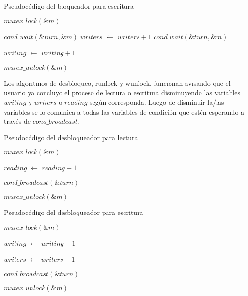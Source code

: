 \begin{algorithm}[H]
  \begin{algorithmic}[1]
  \caption{Pseudocódigo del bloqueador para escritura}
  \label{algo:3-1}
	\State $mutex\_lock(\&m)$

		\State $ cond\_wait(\&turn, \&m) $
	\EndWhile
	\State $writers$ $\leftarrow$ $writers + 1$
		\State $ cond\_wait(\&turn, \&m) $
	\EndWhile
	
	\State $writing$ $\leftarrow$ $writing + 1$

	\State $mutex\_unlock(\&m)$

	\EndProcedure
	\end{algorithmic}
\end{algorithm}

Los algoritmos de desbloqueo, runlock y wunlock, funcionan avisando que el usuario ya concluyo el proceso de lectura o escritura disminuyendo las variables $writing$ y $writers$ o $reading$ según corresponda. Luego de disminuir la/las variables se lo comunica a todas las variables de condición que estén esperando a través de $cond\_broadcast$.

\begin{algorithm}[H]
  \begin{algorithmic}[1]
  \caption{Pseudocódigo del desbloqueador para lectura}
  \label{algo:3-1}
	\State $mutex\_lock(\&m)$

	\State $reading$ $\leftarrow$ $reading - 1$
	
	\State $cond\_broadcast(\&turn)$

	\State $mutex\_unlock(\&m)$

	\EndProcedure
	\end{algorithmic}
\end{algorithm}

\begin{algorithm}[H]
  \begin{algorithmic}[1]
  \caption{Pseudocódigo del desbloqueador para escritura}
  \label{algo:3-1}
	\State $mutex\_lock(\&m)$

	\State $writing$ $\leftarrow$ $writing - 1$
	
	\State $writers$ $\leftarrow$ $writers - 1$
	
	\State $cond\_broadcast(\&turn)$

	\State $mutex\_unlock(\&m)$

	\EndProcedure
	\end{algorithmic}
\end{algorithm}


